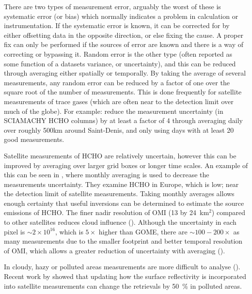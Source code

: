       There are two types of measurement error, arguably the worst of these is systematic error (or bias) which normally indicates a problem in calculation or instrumentation.
      If the systematic error is known, it can be corrected for by either offsetting data in the opposite direction, or else fixing the cause.
      A proper fix can only be performed if the sources of error are known and there is a way of correcting or bypassing it.
      Random error is the other type (often reported as some function of a datasets variance, or uncertainty), and this can be reduced through averaging either spatially or temporally. 
      By taking the average of several measurements, any random error can be reduced by a factor of one over the square root of the number of measurements.
      This is done frequently for satellite measurements of trace gases (which are often near to the detection limit over much of the globe).
      For example: \cite{Vigouroux2009} reduce the measurement uncertainty (in SCIAMACHY HCHO columns) by at least a factor of 4 through averaging daily over roughly 500km around Saint-Denis, and only using days with at least 20 good measurements.
      
      Satellite measurements of HCHO are relatively uncertain, however this can be improved by averaging over larger grid boxes or longer time scales.
      An example of this can be seen in \cite{Dufour2009}, where monthly averaging is used to decrease the measurements uncertainty.
      They examine HCHO in Europe, which is low; near the detection limit of satellite measurements.
      Taking monthly averages allows enough certainty that useful inversions can be determined to estimate the source emissions of HCHO.
      The finer nadir resolution of OMI (13 by 24~km${^2}$) compared to other satellites reduces cloud influence (\cite{Millet2006, Millet2008}). 
      Although the uncertainty in each pixel is $\sim 2 \times 10^{16}$, which is $5 \times$ higher than GOME, there are $\sim 100-200 \times $ as many measurements due to the smaller footprint and better temporal resolution of OMI, which allows a greater reduction of uncertainty with averaging (\cite{Chance2002,Millet2008}).
      
      In cloudy, hazy or polluted areas measurements are more difficult to analyse (\cite[e.g.][]{Palmer2003,Marais2014}).
      Recent work by \cite{Vasilkov2017} showed that updating how the surface reflectivity is incorporated into satellite measurements can change the retrievals by 50~\% in polluted areas.
      
